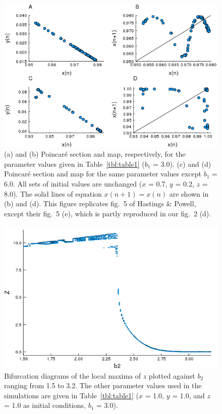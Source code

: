 \documentclass[
]{article}
\begin{document}
\begin{figure}
\hypertarget{fig:fig5}{%
\centering
\includegraphics{figures/fig5.png}
\caption{(a) and (b) Poincaré section and map, respectively, for the
parameter values given in Table~\ref{tbl:table1} (\(b_1\) = 3.0). (c)
and (d) Poincaré section and map for the same parameter values except
\(b_1\) = 6.0. All sets of initial values are unchanged (\(x\) = 0.7,
\(y\) = 0.2, \(z\) = 8.0). The solid lines of equation \(x(n+1) = x(n)\)
are shown in (b) and (d). This figure replicates fig.~5 of Hastings \&
Powell, except their fig.~5 (e), which is partly reproduced in our
fig.~2 (d).}\label{fig:fig5}
}
\end{figure}

\begin{figure}
\hypertarget{fig:figS1}{%
\centering
\includegraphics{figures/figS1.png}
\caption{Bifurcation diagrams of the local maxima of \(z\) plotted
against \(b_2\) ranging from 1.5 to 3.2. The other parameter values used
in the simulations are given in Table~\ref{tbl:table1} (\(x\) = 1.0,
\(y\) = 1.0, and \(z\) = 1.0 as initial conditions, \(b_1\) =
3.0).}\label{fig:figS1}
}
\end{figure}

\printbibliography
\end{document}
